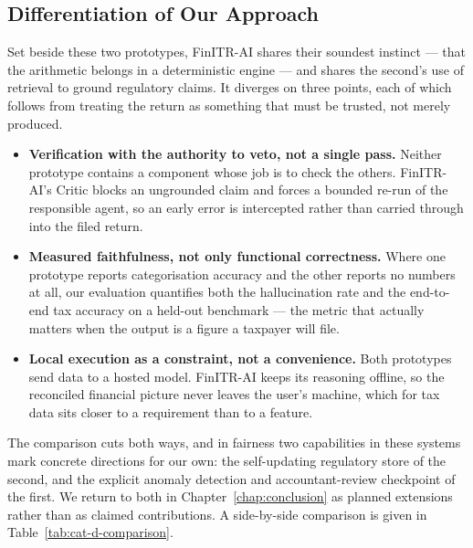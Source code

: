 \subsection{Differentiation of Our Approach}
Set beside these two prototypes, FinITR-AI shares their soundest instinct ---
that the arithmetic belongs in a deterministic engine --- and shares the second's
use of retrieval to ground regulatory claims. It diverges on three points, each
of which follows from treating the return as something that must be trusted, not
merely produced.

\begin{itemize}
    \item \textbf{Verification with the authority to veto, not a single pass.}
          Neither prototype contains a component whose job is to check the others.
          FinITR-AI's Critic blocks an ungrounded claim and forces a bounded
          re-run of the responsible agent, so an early error is intercepted rather
          than carried through into the filed return.
    \item \textbf{Measured faithfulness, not only functional correctness.} Where
          one prototype reports categorisation accuracy and the other reports no
          numbers at all, our evaluation quantifies both the hallucination rate
          and the end-to-end tax accuracy on a held-out benchmark --- the metric
          that actually matters when the output is a figure a taxpayer will file.
    \item \textbf{Local execution as a constraint, not a convenience.} Both
          prototypes send data to a hosted model. FinITR-AI keeps its reasoning
          offline, so the reconciled financial picture never leaves the user's
          machine, which for tax data sits closer to a requirement than to a
          feature.
\end{itemize}

The comparison cuts both ways, and in fairness two capabilities in these systems
mark concrete directions for our own: the self-updating regulatory store of the
second, and the explicit anomaly detection and accountant-review checkpoint of
the first. We return to both in Chapter~\ref{chap:conclusion} as planned
extensions rather than as claimed contributions. A side-by-side comparison is
given in Table~\ref{tab:cat-d-comparison}.

